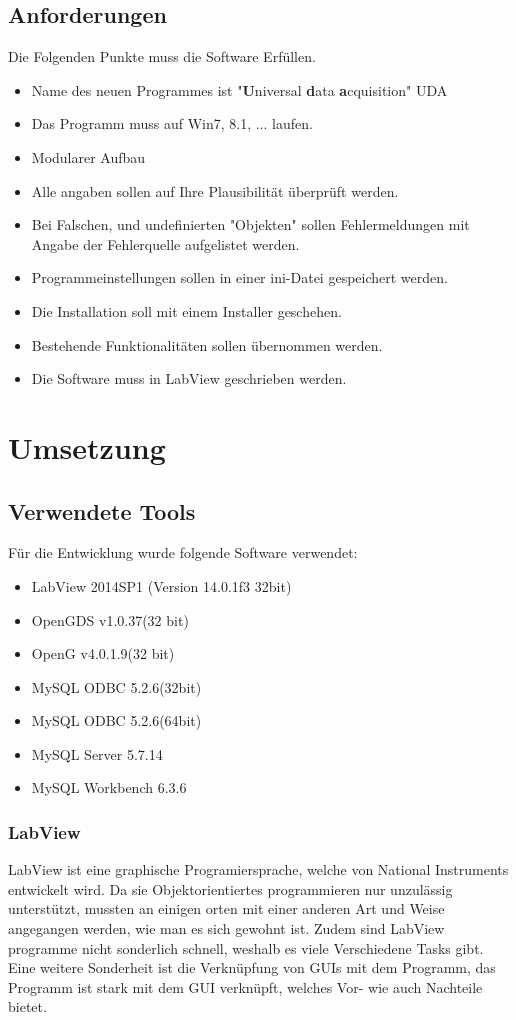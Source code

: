 \documentclass[10pt]{scrartcl}
\begin{document}
\subsection{Anforderungen}	
Die Folgenden Punkte muss die Software Erfüllen.
\begin{itemize}
	\item Name des neuen Programmes ist "\textbf{U}niversal \textbf{d}ata \textbf{a}cquisition" UDA
	\item Das Programm muss auf Win7, 8.1, ... laufen.
	\item Modularer Aufbau
	\item Alle angaben sollen auf Ihre Plausibilität überprüft werden.
	\item Bei Falschen, und undefinierten "Objekten" sollen Fehlermeldungen mit Angabe der Fehlerquelle aufgelistet werden.
	\item Programmeinstellungen sollen in einer ini-Datei gespeichert werden.
	\item Die Installation soll mit einem Installer geschehen.
	\item Bestehende Funktionalitäten sollen übernommen werden.
	\item Die Software muss in LabView geschrieben werden.
\end{itemize}
\section{Umsetzung}
\subsection{Verwendete Tools}
Für die Entwicklung wurde folgende Software verwendet:
\begin{itemize}
	\item LabView 2014SP1 (Version 14.0.1f3 32bit)
	\item OpenGDS v1.0.37(32 bit)
	\item OpenG v4.0.1.9(32 bit)
	\item MySQL ODBC 5.2.6(32bit)
	\item MySQL ODBC 5.2.6(64bit)
	\item MySQL Server 5.7.14
	\item MySQL Workbench 6.3.6
\end{itemize}
\subsubsection{LabView}
LabView ist eine graphische Programiersprache, welche von National Instruments entwickelt wird. Da sie Objektorientiertes programmieren nur unzulässig unterstützt, mussten an einigen orten mit einer anderen Art und Weise angegangen werden, wie man es sich gewohnt ist. Zudem sind LabView programme nicht sonderlich schnell, weshalb es viele Verschiedene Tasks gibt.
Eine weitere Sonderheit ist die Verknüpfung von GUIs mit dem Programm, das Programm ist stark mit dem GUI verknüpft, welches Vor- wie auch Nachteile bietet.
\end{document}

